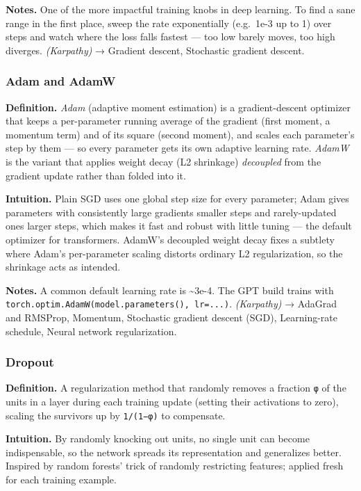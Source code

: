 \documentclass[
  10pt,
  letterpaper,
  onecolumn]{article}
\begin{document}
\textbf{Notes.} One of the more impactful training knobs in deep
learning. To find a sane range in the first place, sweep the rate
exponentially (e.g.~1e-3 up to 1) over steps and watch where the loss
falls fastest --- too low barely moves, too high diverges.
\emph{(Karpathy)} → Gradient descent, Stochastic gradient descent.

\hypertarget{adam-and-adamw}{%
\subsubsection{Adam and AdamW}\label{adam-and-adamw}}

\textbf{Definition.} \emph{Adam} (adaptive moment estimation) is a
gradient-descent optimizer that keeps a per-parameter running average of
the gradient (first moment, a momentum term) and of its square (second
moment), and scales each parameter's step by them --- so every parameter
gets its own adaptive learning rate. \emph{AdamW} is the variant that
applies weight decay (L2 shrinkage) \emph{decoupled} from the gradient
update rather than folded into it.

\textbf{Intuition.} Plain SGD uses one global step size for every
parameter; Adam gives parameters with consistently large gradients
smaller steps and rarely-updated ones larger steps, which makes it fast
and robust with little tuning --- the default optimizer for
transformers. AdamW's decoupled weight decay fixes a subtlety where
Adam's per-parameter scaling distorts ordinary L2 regularization, so the
shrinkage acts as intended.

\textbf{Notes.} A common default learning rate is \textasciitilde3e-4.
The GPT build trains with
\texttt{torch.optim.AdamW(model.parameters(),\ lr=...)}.
\emph{(Karpathy)} → AdaGrad and RMSProp, Momentum, Stochastic gradient descent (SGD),
Learning-rate schedule, Neural network regularization.

\hypertarget{dropout}{%
\subsubsection{Dropout}\label{dropout}}

\textbf{Definition.} A regularization method that randomly removes a
fraction \texttt{φ} of the units in a layer during each training update
(setting their activations to zero), scaling the survivors up by
\texttt{1/(1−φ)} to compensate.

\textbf{Intuition.} By randomly knocking out units, no single unit can
become indispensable, so the network spreads its representation and
generalizes better. Inspired by random forests' trick of randomly
restricting features; applied fresh for each training example.
\end{document}
